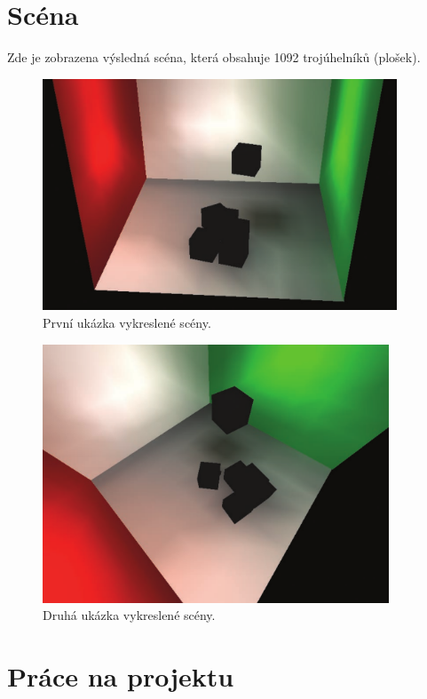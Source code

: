 \documentclass[12pt,a4paper,titlepage,final]{report}
\begin{document}
\chapter{Scéna}

Zde je zobrazena výsledná scéna, která obsahuje 1092 trojúhelníků (plošek). 
\begin{figure}[h]
\begin{center}
\includegraphics[height=6.9cm]{images/screenshot.pdf}
\caption{První ukázka vykreslené scény.}
\end{center}
\end{figure}

\begin{figure}[h]
\begin{center}
\includegraphics[height=7.7cm]{images/screenshot2.pdf}
\caption{Druhá ukázka vykreslené scény.}
\end{center}
\end{figure}

\chapter{Práce na projektu}
\end{document}

